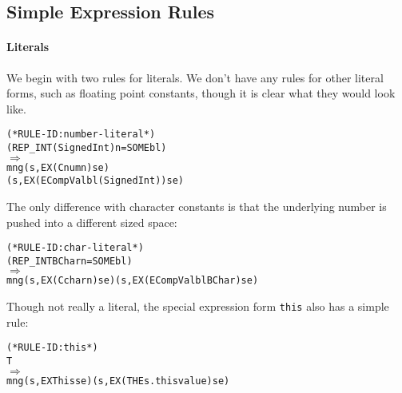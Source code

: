 \documentclass[11pt]{article}
\begin{document}
\subsection{Simple Expression Rules}
\label{sec:simple-expr-rules}

\paragraph{Literals} We begin with two rules for literals.  We don't
have any rules for other literal forms, such as floating point
constants, though it is clear what they would look like.
%
%
\begin{alltt}
(* RULE-ID: number-literal *)
     (REP_INT (Signed Int) n = SOME bl)
   \(\Rightarrow\)
     mng (s, EX (Cnum n) se)
         (s, EX (ECompVal bl (Signed Int)) se)
\end{alltt}

The only difference with character constants is that the underlying
number is pushed into a different sized space:
%
\begin{alltt}
(* RULE-ID: char-literal *)
     (REP_INT BChar n = SOME bl)
   \(\Rightarrow\)
     mng (s, EX (Cchar n) se) (s, EX (ECompVal bl BChar) se)
\end{alltt}

 Though not really a literal, the special
\cpp{} expression form \texttt{this} also has a simple rule:
\begin{center}
\begin{minipage}{\textwidth}
\begin{alltt}
(* RULE-ID: this *)
     T
   \(\Rightarrow\)
     mng (s, EX This se) (s, EX (THE s.thisvalue) se)
\end{alltt}
\end{minipage}
\end{center}
\end{document}
